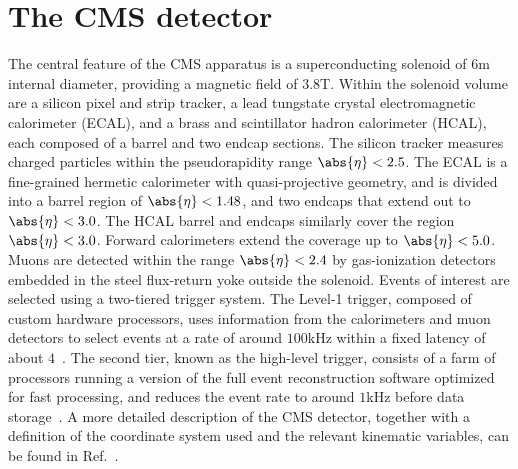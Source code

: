 \section{The CMS detector}
\label{sec:detector}

The central feature of the CMS apparatus is a superconducting solenoid of $6$\unit{m} internal diameter, 
providing a magnetic field of $3.8$\unit{T}. 
Within the solenoid volume are a silicon pixel and strip tracker, 
a lead tungstate crystal electromagnetic calorimeter (ECAL), 
and a brass and scintillator hadron calorimeter (HCAL), 
each composed of a barrel and two endcap sections.
The silicon tracker measures charged particles within the pseudorapidity range $\abs{\eta} < 2.5$. 
The ECAL is a fine-grained hermetic calorimeter with quasi-projective geometry,
and is divided into a barrel region of $\abs{\eta} < 1.48$, and two endcaps that extend out to $\abs{\eta} < 3.0$.
The HCAL barrel and endcaps similarly cover the region $\abs{\eta} < 3.0$.
Forward calorimeters extend the coverage up to $\abs{\eta} < 5.0$.
Muons are detected within the range $\abs{\eta} < 2.4$ 
by gas-ionization detectors embedded in the steel flux-return yoke outside the solenoid.
Events of interest are selected using a two-tiered trigger system. 
The Level-1 trigger, composed of custom hardware processors, uses information from the calorimeters and muon detectors
to select events at a rate of around $100$\unit{kHz} within a fixed latency of about $4$\mus~\cite{Sirunyan:2020zal}. 
The second tier, known as the high-level trigger,
consists of a farm of processors running a version of the full event reconstruction software optimized for fast processing, 
and reduces the event rate to around $1$\unit{kHz} before data storage~\cite{Khachatryan:2016bia}. 
A more detailed description of the CMS detector, 
together with a definition of the coordinate system used and the relevant kinematic variables, can be found in Ref.~\cite{Chatrchyan:2008zzk}. 
